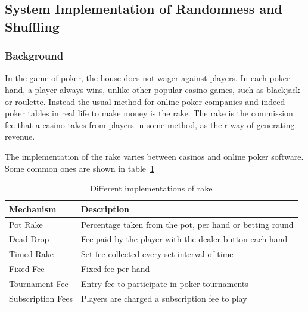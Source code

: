 \subsection{System Implementation of Randomness and Shuffling}\label{section:rng}

\subsubsection{Background}

In the game of poker, the house does not wager against players. In each
poker hand, a player always wins, unlike other popular casino games, such as 
blackjack or roulette. Instead the usual method for online poker companies and
indeed poker tables in real life to make money is the rake. The rake is the 
commission fee that a casino takes from players in some method, as their way 
of generating revenue.

The implementation of the rake varies between casinos and online poker
software. Some common ones are shown in table~\ref{table:rake}

\begin{table}[H]
    \begin{adjustbox}{center}
    \begin{tabular}{l l}
    \toprule
    Mechanism           & Description                                               \\
    \midrule
    Pot Rake            & Percentage taken from the pot, per hand or betting round  \\ \addlinespace
    Dead Drop           & Fee paid by the player with the dealer button each hand   \\ \addlinespace
    Timed Rake          & Set fee collected every set interval of time              \\ \addlinespace
    Fixed Fee           & Fixed fee per hand                                        \\ \addlinespace
    Tournament Fee      & Entry fee to participate in poker tournaments             \\ \addlinespace
    Subscription Fees   & Players are charged a subscription fee to play            \\
    \bottomrule
    \end{tabular}
    \end{adjustbox}
    \caption{Different implementations of rake}
    \label{table:rake}
\end{table}

